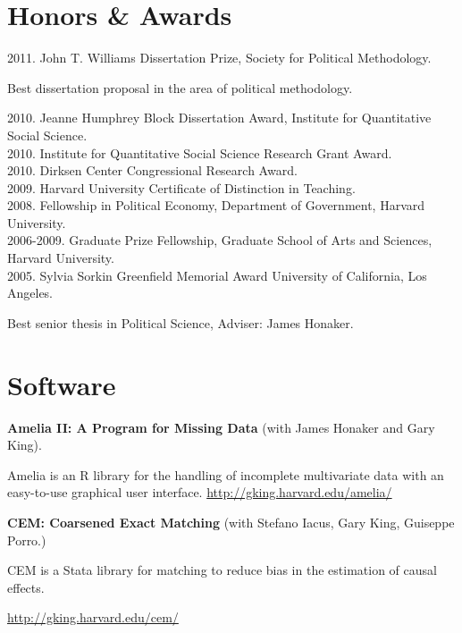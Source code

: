 \documentclass[margin,line]{res}
\newenvironment{list1}{
  \begin{list}{\ding{113}}{%
      \setlength{\itemsep}{0in}
      \setlength{\parsep}{0in} \setlength{\parskip}{0in}
      \setlength{\topsep}{0in} \setlength{\partopsep}{0in} 
      \setlength{\leftmargin}{0.83 cm}}}{\end{list}}
\begin{document}
\begin{resume}
\section{\sc Honors \& Awards}
2011. John T. Williams Dissertation Prize, Society for Political Methodology.
\begin{list1} 
\item[] Best dissertation proposal in the area of political methodology.
\end{list1}
\vspace{-1em}
2010. Jeanne Humphrey Block Dissertation Award, Institute for Quantitative Social Science. \\
2010. Institute for Quantitative Social Science Research Grant Award.\\
2010. Dirksen Center Congressional Research Award.\\
2009. Harvard University Certificate of Distinction in Teaching. \\
2008. Fellowship in Political Economy, Department of Government, Harvard
University.\\
2006-2009. Graduate Prize Fellowship, Graduate School of Arts and Sciences, Harvard
University.\\
2005. Sylvia Sorkin Greenfield Memorial Award University of California, Los Angeles.
\begin{list1} 
\item[] Best senior thesis in Political Science, Adviser: James Honaker.
\end{list1}



\section{\sc Software}
{\bf Amelia II: A Program for Missing Data} (with James Honaker and Gary
King). 
\begin{list1}
\item[] Amelia is an R library for the handling of incomplete multivariate
  data with an easy-to-use graphical user
  interface. \url{http://gking.harvard.edu/amelia/} 
\end{list1}
{\bf CEM: Coarsened Exact Matching} (with Stefano Iacus, Gary
King, Guiseppe  Porro.)
\begin{list1}
\item[] CEM is a Stata library for matching to reduce bias in the estimation of
  causal effects. 
\item[] \url{http://gking.harvard.edu/cem/}
\end{list1}


\end{resume}
\end{document}
